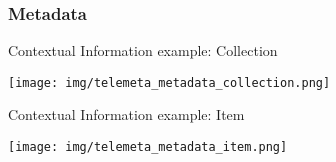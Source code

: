 \documentclass[final, hyperref, table]{beamer}
\begin{document}
\subsubsection{Metadata}
\begin{frame}[label=metadata_example]{Contextual Information example: Collection}
  \begin{center}
    \texttt{[image: img/telemeta\_metadata\_collection.png]}
  \end{center}
\href{http://archives.crem-cnrs.fr/archives/collections/CNRSMH_E_1998_017_001/}{}
 \href{./captures/Collection.html}{}
\hyperlink{telemeta_metadata}{}
\end{frame}
\begin{frame}{Contextual Information example: Item}
  \begin{center}
    \texttt{[image: img/telemeta\_metadata\_item.png]}
  \end{center}
  \href{http://archives.crem-cnrs.fr/archives/items/CNRSMH_E_1998_017_001_001_01/}{}
 \href{./captures/Item.html}{}
\hyperlink{telemeta_metadata}{}
\end{frame}
\end{document}
